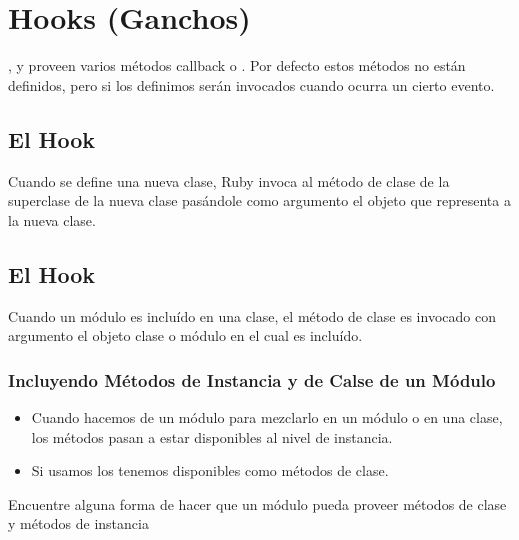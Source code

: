 \section{Hooks (Ganchos)}

\Module{}, \Class{}
y
\Object{}
proveen varios métodos callback o .
Por defecto estos métodos no están definidos, pero si los 
definimos serán invocados cuando ocurra un cierto evento.

\subsection{El Hook }

Cuando se define una nueva clase, Ruby invoca al método de clase
 de la superclase de la nueva clase pasándole
como argumento el objeto que representa a la nueva clase.

\subsection{El Hook }
Cuando un módulo es incluído en una clase, el método
de clase 
es invocado con argumento el objeto clase o módulo en el cual es incluído.

\subsubsection{Incluyendo Métodos de Instancia y de Calse de un Módulo}

\begin{exercise}
\begin{itemize}
\item
Cuando hacemos  de un módulo
para mezclarlo en un módulo o en una clase, los métodos 
pasan a estar disponibles al nivel de instancia.
\item
Si usamos 
los tenemos disponibles como métodos de clase.
\end{itemize}
Encuentre alguna forma de hacer que un módulo pueda proveer
métodos de clase y métodos 
de instancia
\end{exercise}

